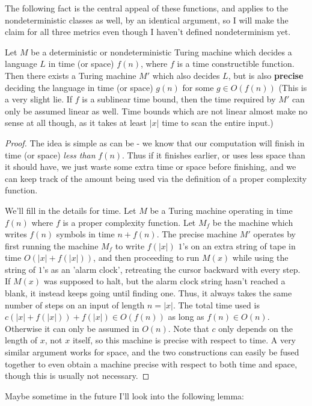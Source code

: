 The following fact is the central appeal of these functions, and applies to the nondeterministic classes as well, by an identical argument, so I will make the claim for all three metrics even though I haven't defined nondeterminism yet.
\begin{theorem}
	Let $M$ be a deterministic or nondeterministic Turing machine which decides a language $L$ in time (or space) $f(n)$, where $f$ is a time constructible function. Then there exists a Turing machine $M'$ which also decides $L$, but is also \textbf{precise} deciding the language in time (or space) $g(n)$ for some $g \in O(f(n))$ (This is a very slight lie. If $f$ is a sublinear time bound, then the time required by $M'$ can only be assumed linear as well. Time bounds which are not linear almost make no sense at all though, as it takes at least $|x|$ time to scan the entire input.)
\end{theorem}
\begin{proof}
	The idea is simple as can be - we know that our computation will finish in time (or space) \textit{less than} $f(n)$. Thus if it finishes earlier, or uses less space than it should have, we just waste some extra time or space before finishing, and we can keep track of the amount being used via the definition of a proper complexity function. 
	\par We'll fill in the details for time. Let $M$ be a Turing machine operating in time $f(n)$ where $f$ is a proper complexity function. Let $M_f$ be the machine which writes $f(n)$ symbols in time $n+f(n)$. The precise machine $M'$ operates by first running the machine $M_f$ to write $f(|x|)$ $1$'s on an extra string of tape in time $O(|x|+f(|x|))$, and then proceeding to run $M(x)$ while using the string of $1$'s as an 'alarm clock', retreating the cursor backward with every step. If $M(x)$ was supposed to halt, but the alarm clock string hasn't reached a blank, it instead keeps going until finding one. Thus, it always takes the same number of steps on an input of length $n = |x|$. The total time used is $c(|x|+f(|x|))+f(|x|) \in O(f(n))$ as long as $f(n) \in O(n)$. Otherwise it can only be assumed in $O(n)$. Note that $c$ only depends on the length of $x$, not $x$ itself, so this machine is precise with respect to time. A very similar argument works for space, and the two constructions can easily be fused together to even obtain a machine precise with respect to both time and space, though this is usually not necessary.  
\end{proof}
Maybe sometime in the future I'll look into the following lemma:
